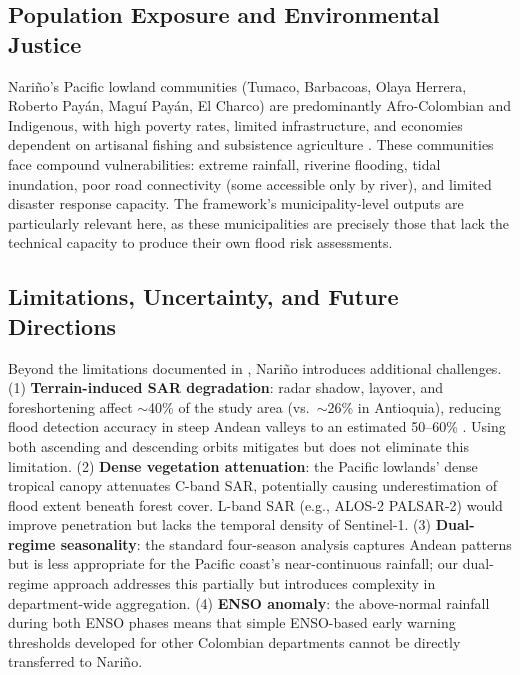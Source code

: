 \documentclass{article}
\begin{document}
\subsection{Population Exposure and Environmental Justice}

Nari\~no's Pacific lowland communities (Tumaco, Barbacoas, Olaya Herrera, Roberto Pay\'an, Magu\'i Pay\'an, El Charco) are predominantly Afro-Colombian and Indigenous, with high poverty rates, limited infrastructure, and economies dependent on artisanal fishing and subsistence agriculture \citep{PalaciosMoreno2022, CamachoDiaz2023}. These communities face compound vulnerabilities: extreme rainfall, riverine flooding, tidal inundation, poor road connectivity (some accessible only by river), and limited disaster response capacity. The framework's municipality-level outputs are particularly relevant here, as these municipalities are precisely those that lack the technical capacity to produce their own flood risk assessments.

\subsection{Limitations, Uncertainty, and Future Directions}
\label{sec:limitations}

Beyond the limitations documented in \citet{EspinalMaya2026Antioquia}, Nari\~no introduces additional challenges. (1) \textbf{Terrain-induced SAR degradation}: radar shadow, layover, and foreshortening affect $\sim$40\% of the study area (vs.\ $\sim$26\% in Antioquia), reducing flood detection accuracy in steep Andean valleys to an estimated 50--60\% \citep{Tarpanelli2022}. Using both ascending and descending orbits mitigates but does not eliminate this limitation. (2) \textbf{Dense vegetation attenuation}: the Pacific lowlands' dense tropical canopy attenuates C-band SAR, potentially causing underestimation of flood extent beneath forest cover. L-band SAR (e.g., ALOS-2 PALSAR-2) would improve penetration but lacks the temporal density of Sentinel-1. (3) \textbf{Dual-regime seasonality}: the standard four-season analysis captures Andean patterns but is less appropriate for the Pacific coast's near-continuous rainfall; our dual-regime approach addresses this partially but introduces complexity in department-wide aggregation. (4) \textbf{ENSO anomaly}: the above-normal rainfall during both ENSO phases means that simple ENSO-based early warning thresholds developed for other Colombian departments cannot be directly transferred to Nari\~no.
\end{document}
